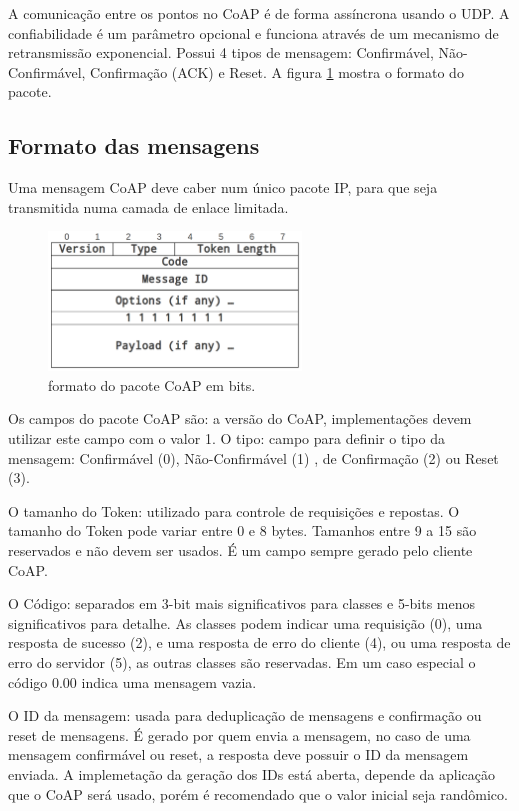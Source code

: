 A comunica\c{c}\~ao entre os pontos no CoAP \'e de forma ass\'incrona usando o UDP. A confiabilidade \'e um par\^ametro opcional e funciona atrav\'es de um mecanismo de retransmiss\~ao exponencial. Possui 4 tipos de mensagem: Confirm\'avel, N\~ao-Confirm\'avel, Confirma\c{c}\~ao (ACK) e Reset. A figura \ref{coapFormat} mostra o formato do pacote.

\subsection{Formato das mensagens}
Uma mensagem CoAP deve caber num \'unico pacote IP, para que seja transmitida numa camada de enlace limitada.
\begin{figure}[h]
    \label{coapFormat}
    \centering
    \includegraphics[width=0.6\textwidth]{figuras/formato.png}
    \caption{formato do pacote CoAP  em bits. \cite{draft-ietf-core-coap-18}}
\end{figure}


Os campos do pacote CoAP s\~ao: a vers\~ao do CoAP, implementa\c{c}\~oes devem utilizar este campo com o valor 1. O tipo: campo para definir o tipo da mensagem: Confirm\'avel (0), N\~ao-Confirm\'avel (1) , de Confirma\c{c}\~ao (2) ou Reset (3).

O tamanho do Token: utilizado para controle de requisi\c{c}\~oes e repostas. O tamanho do Token pode variar entre 0 e 8 bytes. Tamanhos entre 9 a 15 s\~ao reservados e n\~ao devem ser usados. \'E um campo sempre gerado pelo cliente CoAP.

O C\'odigo: separados em 3-bit mais significativos para classes e 5-bits menos significativos para detalhe. As classes podem indicar uma requisi\c{c}\~ao (0), uma resposta de sucesso (2), e uma resposta de erro do cliente (4), ou uma resposta de erro do servidor (5), as outras classes s\~ao reservadas. Em um caso especial o c\'odigo 0.00 indica uma mensagem vazia.

O ID da mensagem: usada para deduplica\c{c}\~ao de mensagens e confirma\c{c}\~ao ou reset de mensagens. \'E gerado por quem envia a mensagem, no caso de uma mensagem confirm\'avel ou reset, a resposta deve possuir o ID da mensagem enviada. A implemeta\c{c}\~ao da gera\c{c}\~ao dos IDs est\'a aberta, depende da aplica\c{c}\~ao que o CoAP ser\'a usado, por\'em \'e recomendado que o valor inicial seja rand\^omico.
   
